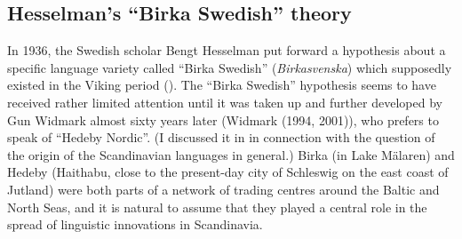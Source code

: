 \subsection{\rmfamily Hesselman’s “Birka Swedish” theory}
\label{bkm:Ref134938069}
\begin{styleBodyTextFirst}
In 1936, the Swedish scholar Bengt Hesselman put forward a hypothesis about a specific language variety called “Birka Swedish” (\textit{Birkasvenska}) which supposedly existed in the Viking period (\citet{Hesselman1936}). The “Birka Swedish” hypothesis seems to have received rather limited attention until it was taken up and further developed by Gun Widmark almost sixty years later (Widmark (1994, 2001)), who prefers to speak of “Hedeby Nordic”. (I discussed it in \citet{Dahl2001} in connection with the question of the origin of the Scandinavian languages in general.) Birka (in Lake Mälaren) and Hedeby (Haithabu, close to the present-day city of Schleswig on the east coast of Jutland) were both parts of a network of trading centres around the Baltic and North Seas, and it is natural to assume that they played a central role in the spread of linguistic innovations in Scandinavia. 

\end{styleBodyTextFirst}

